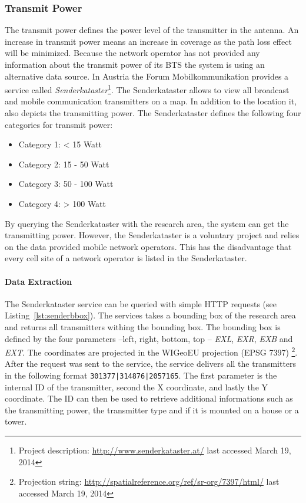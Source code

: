 \documentclass[master,english]{hgbthesis}
\begin{document}
\subsubsection{Transmit Power}

The transmit power defines the power level of the transmitter in the antenna. An increase in transmit power means an increase in coverage as the path loss effect will be minimized. Because the network operator has not provided any information about the transmit power of its BTS the system is using an alternative data source. In Austria the Forum Mobilkommunikation provides a service called \emph{Senderkataster}\footnote{Project description: \url{http://www.senderkataster.at/} last accessed March 19, 2014}. The Senderkataster allows to view all broadcast and mobile communication transmitters on a map. In addition to the location it, also depicts the transmitting power. The Senderkataster defines the following four categories for transmit power:

\begin{itemize}

	\item Category 1: < 15 Watt

	\item Category 2: 15 - 50 Watt

	\item Category 3: 50 - 100 Watt

	\item Category 4: > 100 Watt 

\end{itemize}

By querying the Senderkataster with the research area, the system can get the transmitting power. However, the Senderkataster is a voluntary project and relies on the data provided mobile network operators. This has the disadvantage that every cell site of a network operator is listed in the Senderkataster.

\paragraph{Data Extraction}

The Senderkataster service can be queried with simple HTTP requests (see Listing~\ref{lst:senderbbox}). The services takes a bounding box of the research area and returns all transmitters withing the bounding box. The bounding box is defined by the four parameters --left, right, bottom, top -- \emph{EXL}, \emph{EXR}, \emph{EXB} and \emph{EXT}. The coordinates are projected in the WIGeoEU projection (EPSG 7397) \footnote{Projection string: \url{http://spatialreference.org/ref/sr-org/7397/html/} last accessed March 19, 2014}. After the request was sent to the service, the service delivers all the transmitters in the following format \lstinline+301377|314876|2057165+. The first parameter is the internal ID of the transmitter, second the X coordinate, and lastly the Y coordinate. The ID can then be used to retrieve additional informations such as the transmitting power, the transmitter type and if it is mounted on a house or a tower.
\end{document}
